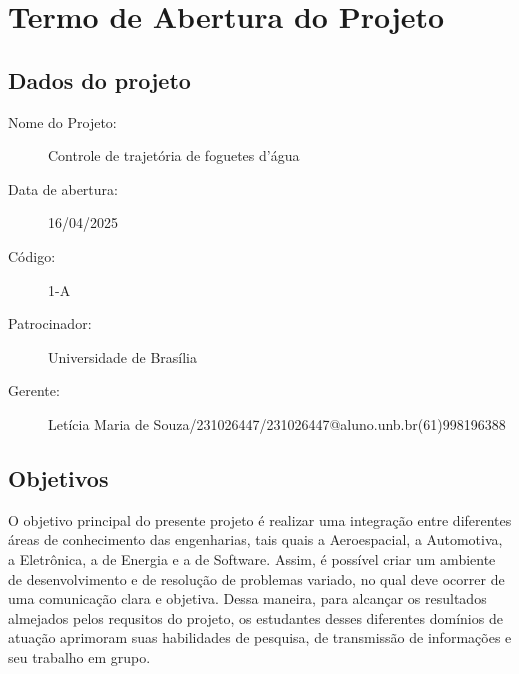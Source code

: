 \chapter{Termo de Abertura do Projeto}


\section{Dados do projeto}
\begin{description}
    \item [Nome do Projeto:] Controle de trajetória de foguetes d'água 
    \item [Data de abertura:] 16/04/2025
    \item [Código:] 1-A
    \item [Patrocinador:] Universidade de Brasília
    \item [Gerente:] Letícia Maria de Souza/231026447/231026447@aluno.unb.br(61)998196388
\end{description}

\section{Objetivos}
O objetivo principal do presente projeto é realizar uma integração entre diferentes áreas de conhecimento das engenharias, tais quais a Aeroespacial, a Automotiva, a Eletrônica, a de Energia e a de Software. Assim, é possível criar um ambiente de desenvolvimento e de resolução de problemas variado, no qual deve ocorrer de uma comunicação clara e objetiva. Dessa maneira, para alcançar os resultados almejados pelos requsitos do projeto, os estudantes desses diferentes domínios de atuação aprimoram suas habilidades de pesquisa, de transmissão de informações e seu trabalho em grupo.


